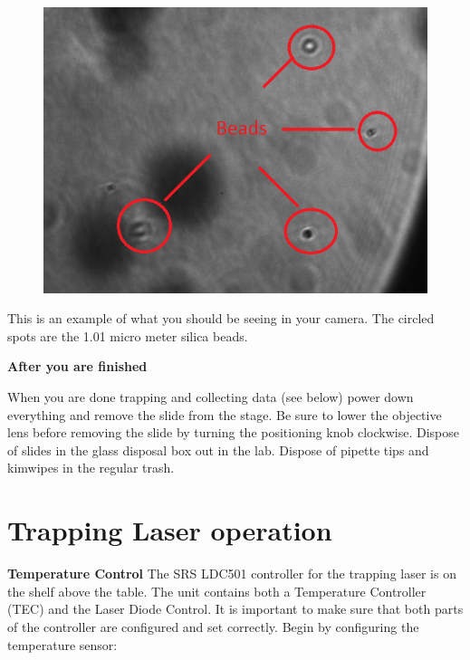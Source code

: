 \documentclass{../lab}
\begin{document}
\begin{figure}[h]
    \centering
    \href{http://experimentationlab.berkeley.edu/sites/default/files/OTZ/Beads.png}{\includegraphics[width=0.5\linewidth]{images/Beads.png}}
    \caption{}
    \label{fig:Beads}
\end{figure}

This is an example of what you should be seeing in your camera. The circled spots are the 1.01 micro meter silica beads.

\textbf{After you are finished}

When you are done trapping and collecting data (see below) power down everything and remove the slide from the stage. Be sure to lower the objective lens before removing the slide by turning the positioning knob clockwise.  Dispose of slides in the glass disposal box out in the lab. Dispose of pipette tips and kimwipes in the regular trash.

\section{Trapping Laser operation}

\textbf{Temperature Control} The SRS LDC501 controller for the trapping laser is on the shelf above the table. The unit contains both a Temperature Controller (TEC) and the Laser Diode Control. It is important to make sure that both parts of the controller are configured and set correctly. Begin by configuring the temperature sensor:
\end{document}
